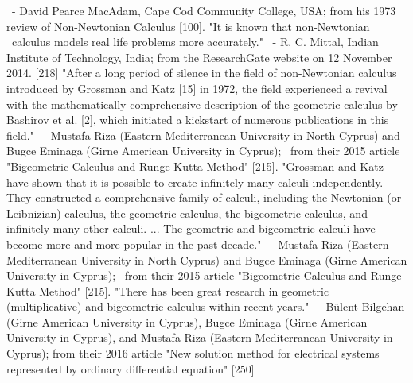 \documentclass[12pt]{article}
\begin{document}
 - David Pearce MacAdam, Cape Cod Community College, USA; from his 1973 review of Non-Newtonian Calculus [100].
"It is known that non-Newtonian  calculus models real life problems more accurately."  - R. C. Mittal, Indian Institute of Technology, India; from the ResearchGate website on 12 November 2014. [218]
"After a long period of silence in the field of non-Newtonian calculus introduced by Grossman and Katz [15] in 1972, the field experienced a revival with the mathematically comprehensive description of the geometric calculus by Bashirov et al. [2], which initiated a kickstart of numerous publications in this field."  - Mustafa Riza (Eastern Mediterranean University in North Cyprus) and Bugce Eminaga (Girne American University in Cyprus);  from their 2015 article "Bigeometric Calculus and Runge Kutta Method" [215].
"Grossman and Katz have shown that it is possible to create infinitely many calculi independently. They constructed a comprehensive family of calculi, including the Newtonian (or Leibnizian) calculus, the geometric calculus, the bigeometric calculus, and infinitely-many other calculi. ... The geometric and bigeometric calculi have become more and more popular in the past decade."  - Mustafa Riza (Eastern Mediterranean University in North Cyprus) and Bugce Eminaga (Girne American University in Cyprus);  from their 2015 article "Bigeometric Calculus and Runge Kutta Method" [215].
"There has been great research in geometric (multiplicative) and bigeometric calculus within recent years."
 - Bülent Bilgehan (Girne American University in Cyprus), Bugce Eminaga (Girne American University in Cyprus), and Mustafa Riza (Eastern Mediterranean University in Cyprus); from their 2016 article "New solution method for electrical systems represented by ordinary differential equation" [250]
\end{document}
